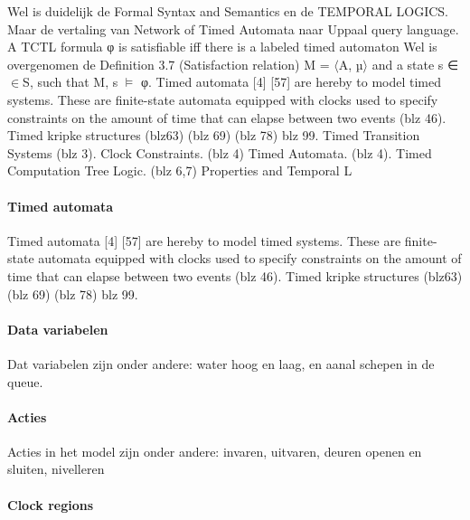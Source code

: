  

 \cite{03CHAPTER3}
 Wel is duidelijk de Formal Syntax and Semantics en de TEMPORAL LOGICS. Maar de vertaling van 
 Network of Timed Automata naar Uppaal query language. A TCTL formula φ is satisfiable iff there is a labeled timed automaton
 Wel is overgenomen de Definition 3.7 (Satisfaction relation) 
 M = $\langle$A, µ$\rangle$ and a state s ∈$\in$S, such that M, s $\models$ φ.
 \cite{isbn9789526031033}
 Timed automata [4] [57] are hereby to model timed systems. These are finite-state automata
 equipped with clocks used to specify constraints on the amount of time that can elapse
 between two events (blz 46). Timed kripke structures (blz63) (blz 69) (blz 78) blz 99.
 \cite{nourollahi20191215}
 \cite{Lecture2}
 Timed Transition Systems (blz 3). Clock Constraints. (blz 4) Timed Automata.  (blz 4). Timed Computation Tree Logic.  (blz 6,7)
 \cite{LIPIcs-TIME-2021-12}
 Properties and Temporal L
 \cite{mctutorial}
 \cite{FULLTEXT02}
 \cite{stanfordRealtime}
 \cite{baierKatoenModelChecking}
 
 
 \paragraph{Timed automata}
  Timed automata [4] [57] are hereby to model timed systems. These are finite-state automata
 equipped with clocks used to specify constraints on the amount of time that can elapse
 between two events (blz 46). Timed kripke structures (blz63) (blz 69) (blz 78) blz 99.
 \cite{nourollahi20191215}
 
\paragraph{Data variabelen}
Dat variabelen zijn onder andere: water hoog  en laag, en aanal schepen in de queue.
\paragraph{Acties}
 Acties in het model zijn onder andere: invaren, uitvaren, deuren openen en sluiten, nivelleren
\paragraph{Clock regions}
\cite{clarke2000Modelchecking}
\cite[p.~5]{clarke2000Modelchecking}
\cite{clarke2000Modelchecking21}
\cite{clarke2000Modelchecking212}
\cite{clarke2000Modelchecking223}
\cite{clarke2000Modelchecking31}
\cite{clarke2000Modelchecking32}
\cite{clarke2000Modelchecking33}
\cite{clarke2000Modelchecking411}
\cite{clarke2000Modelchecking43}
\cite{clarke2000Modelchecking63}
\cite{clarke2000Modelchecking64}
\cite{clarke2000Modelchecking661}
\cite{clarke2000Modelchecking91}
\cite{clarke2000Modelchecking102}
\cite{clarke2000Modelchecking11}
\cite{clarke2000Modelchecking122}
\cite{clarke2000Modelchecking123}
\cite{clarke2000Modelchecking132}
\cite{clarke2000Modelchecking1321}
\cite{clarke2000Modelchecking152}
\cite{clarke2000Modelchecking171}
\cite{clarke2000Modelchecking172}
\cite{clarke2000Modelchecking173}

